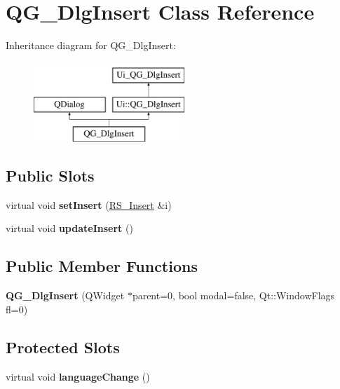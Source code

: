 \hypertarget{classQG__DlgInsert}{\section{Q\-G\-\_\-\-Dlg\-Insert Class Reference}
\label{classQG__DlgInsert}
}
Inheritance diagram for Q\-G\-\_\-\-Dlg\-Insert\-:\begin{figure}[H]
\begin{center}
\leavevmode
\includegraphics[height=3.000000cm]{classQG__DlgInsert}
\end{center}
\end{figure}
\subsection*{Public Slots}
\begin{DoxyCompactItemize}
\item 
\hypertarget{classQG__DlgInsert_a6102feca7f444f1ea0694a1e176e2429}{virtual void {\bfseries set\-Insert} (\hyperlink{classRS__Insert}{R\-S\-\_\-\-Insert} \&i)}\label{classQG__DlgInsert_a6102feca7f444f1ea0694a1e176e2429}

\item 
\hypertarget{classQG__DlgInsert_a35be775c083f9e69e384c321cb0900f8}{virtual void {\bfseries update\-Insert} ()}\label{classQG__DlgInsert_a35be775c083f9e69e384c321cb0900f8}

\end{DoxyCompactItemize}
\subsection*{Public Member Functions}
\begin{DoxyCompactItemize}
\item 
\hypertarget{classQG__DlgInsert_af556cd44fde026470ccc5adf8b1ae0f3}{{\bfseries Q\-G\-\_\-\-Dlg\-Insert} (Q\-Widget $\ast$parent=0, bool modal=false, Qt\-::\-Window\-Flags fl=0)}\label{classQG__DlgInsert_af556cd44fde026470ccc5adf8b1ae0f3}

\end{DoxyCompactItemize}
\subsection*{Protected Slots}
\begin{DoxyCompactItemize}
\item 
\hypertarget{classQG__DlgInsert_a8108738cf340afbac6e9e3cc34c9aa37}{virtual void {\bfseries language\-Change} ()}\label{classQG__DlgInsert_a8108738cf340afbac6e9e3cc34c9aa37}

\end{DoxyCompactItemize}
